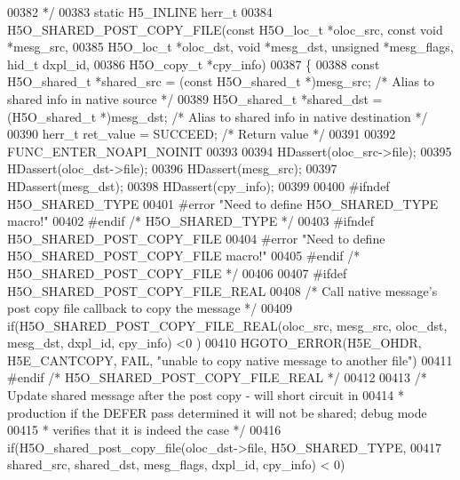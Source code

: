 \begin{DoxyCode}
00382 \textcolor{comment}{ */}
00383 static H5\_INLINE herr\_t
00384 H5O\_SHARED\_POST\_COPY\_FILE(const H5O\_loc\_t *oloc\_src, const \textcolor{keywordtype}{void} *mesg\_src,
00385     H5O\_loc\_t *oloc\_dst, \textcolor{keywordtype}{void} *mesg\_dst, \textcolor{keywordtype}{unsigned} *mesg\_flags, hid\_t dxpl\_id,
00386     H5O\_copy\_t *cpy\_info)
00387 \{
00388     \textcolor{keyword}{const} H5O\_shared\_t  *shared\_src = (\textcolor{keyword}{const} H5O\_shared\_t *)mesg\_src; \textcolor{comment}{/* Alias to shared info in native
       source */}
00389     H5O\_shared\_t        *shared\_dst = (H5O\_shared\_t *)mesg\_dst; \textcolor{comment}{/* Alias to shared info in native
       destination */}
00390     herr\_t              ret\_value = SUCCEED;         \textcolor{comment}{/* Return value */}
00391 
00392     FUNC\_ENTER\_NOAPI\_NOINIT
00393 
00394     HDassert(oloc\_src->file);
00395     HDassert(oloc\_dst->file);
00396     HDassert(mesg\_src);
00397     HDassert(mesg\_dst);
00398     HDassert(cpy\_info);
00399 
00400 \textcolor{preprocessor}{#ifndef H5O\_SHARED\_TYPE}
00401 \textcolor{preprocessor}{#error "Need to define H5O\_SHARED\_TYPE macro!"}
00402 \textcolor{preprocessor}{#endif }\textcolor{comment}{/* H5O\_SHARED\_TYPE */}\textcolor{preprocessor}{}
00403 \textcolor{preprocessor}{#ifndef H5O\_SHARED\_POST\_COPY\_FILE}
00404 \textcolor{preprocessor}{#error "Need to define H5O\_SHARED\_POST\_COPY\_FILE macro!"}
00405 \textcolor{preprocessor}{#endif }\textcolor{comment}{/* H5O\_SHARED\_POST\_COPY\_FILE */}\textcolor{preprocessor}{}
00406 
00407 \textcolor{preprocessor}{#ifdef H5O\_SHARED\_POST\_COPY\_FILE\_REAL}
00408     \textcolor{comment}{/* Call native message's post copy file callback to copy the message */}
00409     \textcolor{keywordflow}{if}(H5O\_SHARED\_POST\_COPY\_FILE\_REAL(oloc\_src, mesg\_src, oloc\_dst, mesg\_dst, dxpl\_id, cpy\_info) <0 )
00410         HGOTO\_ERROR(H5E\_OHDR, H5E\_CANTCOPY, FAIL, \textcolor{stringliteral}{"unable to copy native message to another file"})
00411 \textcolor{preprocessor}{#endif }\textcolor{comment}{/* H5O\_SHARED\_POST\_COPY\_FILE\_REAL */}\textcolor{preprocessor}{}
00412 
00413     \textcolor{comment}{/* Update shared message after the post copy - will short circuit in}
00414 \textcolor{comment}{     * production if the DEFER pass determined it will not be shared; debug mode}
00415 \textcolor{comment}{     * verifies that it is indeed the case */}
00416     \textcolor{keywordflow}{if}(H5O\_shared\_post\_copy\_file(oloc\_dst->file, H5O\_SHARED\_TYPE,
00417             shared\_src, shared\_dst, mesg\_flags, dxpl\_id, cpy\_info) < 0)

\end{DoxyCode}
